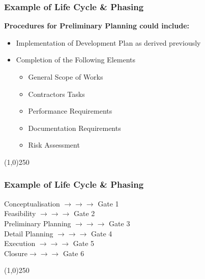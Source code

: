 \begin{frame}
\frametitle{Example of Life Cycle \& Phasing}
\textbf{Procedures for Preliminary Planning could include:}\\
\begin{itemize}
	\item Implementation of Development Plan as derived previously
	\item Completion of the Following Elements
	\begin{itemize}
		\item General Scope of Works
		\item Contractors Tasks
		\item Performance Requirements
		\item Documentation Requirements
		\item Risk Assessment
	\end{itemize}
\end{itemize}
\end{frame}
\begin{center}\line(1,0){250}\end{center}



\begin{frame}
\frametitle{Example of Life Cycle \& Phasing}
Conceptualisation \hfill$\longrightarrow\longrightarrow\longrightarrow$ Gate 1\\
Feasibility \hfill$\longrightarrow\longrightarrow\longrightarrow$ Gate 2\\
Preliminary Planning \hfill$\longrightarrow\longrightarrow\longrightarrow$ Gate 3\\
Detail Planning \hfill$\longrightarrow\longrightarrow\longrightarrow$ Gate 4\\
Execution \hfill$\longrightarrow\longrightarrow\longrightarrow$ Gate 5\\
Closure\hfill$\longrightarrow\longrightarrow\longrightarrow$ Gate 6\\
\end{frame}
\begin{center}\line(1,0){250}\end{center}



